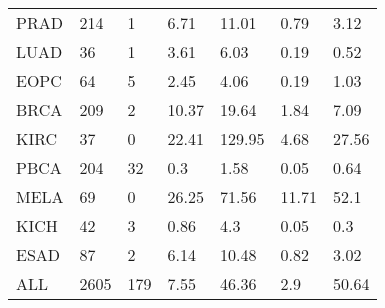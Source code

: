 \documentclass[a4paper,10pt]{article}
\begin{document}
\begin{table}[]
\begin{tabular}{l|l|l|l|l|l|l}
PRAD&214&1&6.71&11.01&0.79&3.12\\
LUAD&36&1&3.61&6.03&0.19&0.52\\
EOPC&64&5&2.45&4.06&0.19&1.03\\
BRCA&209&2&10.37&19.64&1.84&7.09\\
KIRC&37&0&22.41&129.95&4.68&27.56\\
PBCA&204&32&0.3&1.58&0.05&0.64\\
MELA&69&0&26.25&71.56&11.71&52.1\\
KICH&42&3&0.86&4.3&0.05&0.3\\
ESAD&87&2&6.14&10.48&0.82&3.02\\
ALL&2605&179&7.55&46.36&2.9&50.64\\
\end{tabular}
\end{table}
\end{document}
